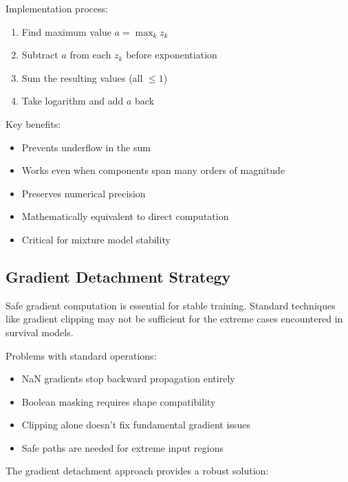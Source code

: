 Implementation process:
\begin{enumerate}
    \item Find maximum value $a = \max_k z_k$
    \item Subtract $a$ from each $z_k$ before exponentiation
    \item Sum the resulting values (all $\leq 1$)
    \item Take logarithm and add $a$ back
\end{enumerate}

Key benefits:
\begin{itemize}
    \item Prevents underflow in the sum
    \item Works even when components span many orders of magnitude
    \item Preserves numerical precision
    \item Mathematically equivalent to direct computation
    \item Critical for mixture model stability
\end{itemize}

\subsection{Gradient Detachment Strategy}

Safe gradient computation is essential for stable training. Standard techniques like gradient clipping may not be sufficient for the extreme cases encountered in survival models.

\begin{notebox}[title=Gradient Challenges]
Problems with standard operations:
\begin{itemize}
    \item NaN gradients stop backward propagation entirely
    \item Boolean masking requires shape compatibility
    \item Clipping alone doesn't fix fundamental gradient issues
    \item Safe paths are needed for extreme input regions
\end{itemize}
\end{notebox}

The gradient detachment approach provides a robust solution:

